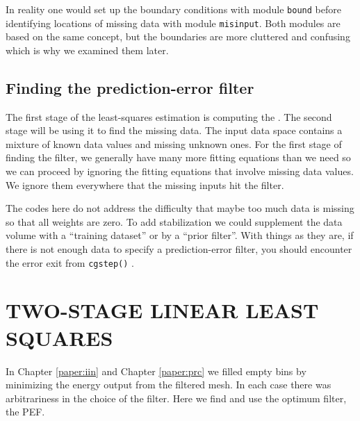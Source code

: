 \par
In reality one would set up the boundary conditions
with module
\texttt{bound}
before identifying locations of missing data
with module
\texttt{misinput}.
Both modules are based on the same concept,
but the boundaries are more cluttered and confusing
which is why we examined them later.


\subsection{Finding the prediction-error filter}

\par
The first stage of the least-squares estimation
is computing the
.
The second stage will be using it to find the missing data.
The input data space contains a mixture of known data values
and missing unknown ones.
For the first stage of finding the filter,
we generally have many more fitting equations than we need
so we can proceed by ignoring the fitting equations
that involve missing data values.
We ignore them everywhere that the missing inputs hit the filter.

\par
The codes here do not address the difficulty that maybe
too much data is missing so that all weights are zero.
To add stabilization we could supplement the data volume
with a ``training dataset''
or by a ``prior filter''.
With things as they are,
if there is not enough data to specify a prediction-error filter,
you should encounter the error exit from \texttt{cgstep()} 
.




\section{TWO-STAGE LINEAR LEAST SQUARES}
In Chapter \ref{paper:iin} and
Chapter    \ref{paper:prc}
we filled empty bins
by minimizing the energy output from the filtered mesh.
In each case there was arbitrariness in the choice of the filter.
Here we find and use the optimum filter, the PEF.

